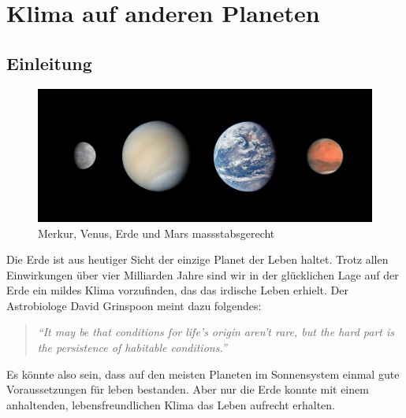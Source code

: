 %
%
%

\chapter{Klima auf anderen Planeten\label{chapter:thema}}
\begin{refsection}

\section{Einleitung}

\begin{figure}
	\centering
	\includegraphics[width=0.7\linewidth, trim={0 2cm 0 2cm},clip]{planeten/Pictures/planets2.jpg}
	\caption{Merkur, Venus, Erde und Mars massstabsgerecht}
\end{figure}

Die Erde ist aus heutiger Sicht der einzige Planet der Leben haltet. Trotz allen Einwirkungen über vier Milliarden Jahre sind wir in der glücklichen Lage auf der Erde ein mildes Klima vorzufinden, das das irdische Leben erhielt. 
Der Astrobiologe David Grinspoon meint dazu folgendes:
\begin{quote}
\textit{“It may be that conditions for life’s origin aren’t rare, but the hard part is the persistence of habitable conditions.”} \\
\end{quote}
Es könnte also sein, dass auf den meisten Planeten im Sonnensystem einmal gute Voraussetzungen für leben bestanden. Aber nur die Erde konnte mit einem anhaltenden, lebensfreundlichen Klima das Leben aufrecht erhalten.


\end{refsection}
